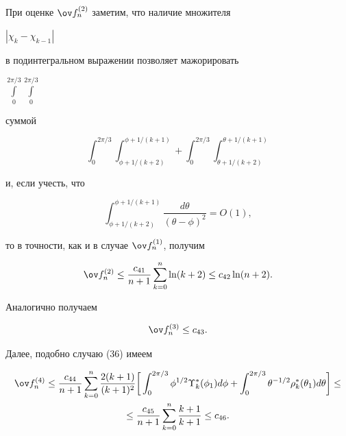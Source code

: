 При оценке $\ov f_n^{(2)}$ заметим, что наличие множителя


$|\chi_k -\chi_{k-1}|$


в подинтегральном выражении позволяет мажорировать


$\int\limits_0^{{2\pi}/{3}}\int\limits_0^{{2\pi}/{3}}$


суммой


$$


\int_0^{{2\pi}/{3}}\int_{\phi+{1}/(k+2)}^{\phi+{1}/(k+1)}


+\int_0^{{2\pi}/{3}}\int_{\theta+{1}/(k+2)}^


{\theta+{1}/(k+1)}


$$


и, если учесть, что


$$


\int_{\phi+{1}/(k+2)}^{\phi+{1}/(k+1)}\frac{d\theta}


{(\theta-\phi)^2}=O(1),


$$


то в точности, как и в случае $\ov f_n^{(1)}$, получим


\begin{equation}


\ov f_n^{(2)}\le \frac{c_{41}}{n+1}\sum_{k=0}^n\ln(k+2)


\le c_{42} \ln (n+2).


\end{equation}


Аналогично получаем


\begin{equation}


\ov f_n^{(3)}\le c_{43}.


\end{equation}


Далее, подобно случаю (36) имеем


\begin{multline}


\ov f_n^{(4)}\le \frac{c_{44}}{n+1}\sum_{k=0}^n \frac{2(k+1)}{(k+1)^2}


\bigg[\int_0^{{2\pi}/{3}}


\phi^{{1}/{2}}\Upsilon_k^* ( \phi_1)d\phi+


\int_0^{{2\pi}/{3}}\theta^{- {1}/{2}}


\rho_k^* (\theta_1)d\theta\bigg ]\le \\


%


\le\frac{c_{45}}{n+1}\sum_{k=0}^n \frac{k+1}{k+1}\le c_{46}.


\end{multline}


